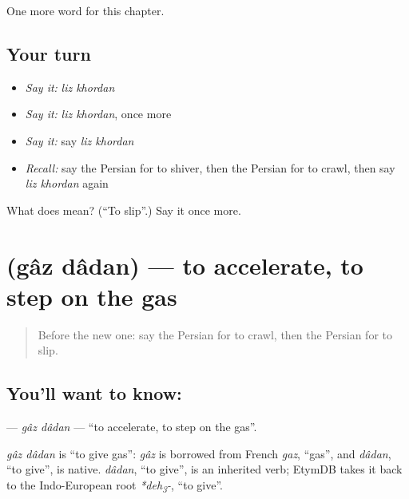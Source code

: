 \begin{grammarlens}[title={What you've built}]
One more word for this chapter.
\end{grammarlens}

\subsection*{Your turn}
\begin{itemize}
\raggedright
  \item \emph{Say it:} \emph{liz khordan}
  \item \emph{Say it:} \emph{liz khordan}, once more
  \item \emph{Say it:} say \emph{liz khordan}
  \item \emph{Recall:} say the Persian for to shiver, then the Persian for to crawl, then say \emph{liz khordan} again
\end{itemize}

\begin{tcolorbox}[breakable,colback=teal!4,colframe=teal!35!black,title={Before you move on}]
What does   mean? (\textquotedblleft{}To slip\textquotedblright{}.) Say it once more.
\end{tcolorbox}
\section[\texorpdfstring{\fa{گاز} \fa{دادن} (gâz dâdan)}{گاز دادن (gâz dâdan)}]{  (gâz dâdan) — to accelerate, to step on the gas}

\label{lesson:FA-C187-gaz-dadan}



\begin{quote}
Before the new one: say the Persian for to crawl, then the Persian for to slip.
\end{quote}

\subsection*{You'll want to know:  }
\textbf{ } — \emph{gâz dâdan} — \textquotedblleft{}to accelerate, to step on the gas\textquotedblright{}.

\begin{cousinweb}
\emph{gâz dâdan} is \textquotedblleft{}to give gas\textquotedblright{}: \emph{gâz} is borrowed from French \emph{gaz}, \textquotedblleft{}gas\textquotedblright{}, and \emph{dâdan}, \textquotedblleft{}to give\textquotedblright{}, is native. \emph{dâdan}, \textquotedblleft{}to give\textquotedblright{}, is an inherited verb; EtymDB takes it back to the Indo-European root \emph{*deh\textsubscript{3}-}, \textquotedblleft{}to give\textquotedblright{}.
\end{cousinweb}

